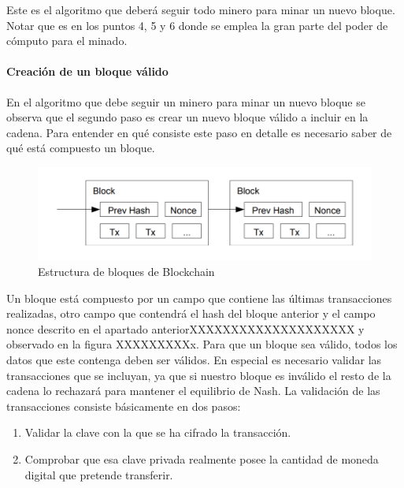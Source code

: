 Este es el algoritmo que deberá seguir todo minero para minar un nuevo bloque. Notar que es en los puntos 4, 5 y 6 donde se emplea la gran parte del poder de cómputo para el minado.

\paragraph{Creación de un bloque válido}
En el algoritmo que debe seguir un minero para minar un nuevo bloque se observa que el segundo paso es crear un nuevo bloque válido a incluir en la cadena. Para entender en qué consiste este paso en detalle es necesario saber de qué está compuesto un bloque.\newline 

\begin{figure}
	\centering
	\includegraphics[width=1\textwidth]{imagenes/bloque.PNG}
	\caption{\label{fig1}Estructura de bloques de Blockchain \cite{bitcoin}}
\end{figure}

Un bloque está compuesto por un campo que contiene las últimas transacciones realizadas, otro campo que contendrá el hash del bloque anterior y el campo nonce descrito en el apartado anteriorXXXXXXXXXXXXXXXXXXXX y observado en la figura XXXXXXXXXx. Para que un bloque sea válido, todos los datos que este contenga deben ser válidos. En especial es necesario validar las transacciones que se incluyan, ya que si nuestro bloque es inválido el resto de la cadena lo rechazará para mantener el equilibrio de Nash.
La validación de las transacciones consiste básicamente en dos pasos:

\begin{enumerate}
	\item Validar la clave con la que se ha cifrado la transacción.
	\item Comprobar que esa clave privada realmente posee la cantidad de moneda digital que pretende transferir.
\end{enumerate}

